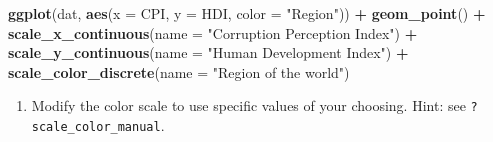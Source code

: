 \documentclass[]{book}
\newenvironment{Shaded}{\begin{snugshade}}{\end{snugshade}}
\newcommand{\KeywordTok}[1]{\textcolor[rgb]{0.13,0.29,0.53}{\textbf{#1}}}
\newcommand{\DataTypeTok}[1]{\textcolor[rgb]{0.13,0.29,0.53}{#1}}
\newcommand{\StringTok}[1]{\textcolor[rgb]{0.31,0.60,0.02}{#1}}
\newcommand{\OperatorTok}[1]{\textcolor[rgb]{0.81,0.36,0.00}{\textbf{#1}}}
\newcommand{\NormalTok}[1]{#1}
\providecommand{\tightlist}{%
  \setlength{\itemsep}{0pt}\setlength{\parskip}{0pt}}
\begin{document}
\begin{Shaded}
\begin{Highlighting}[]
\KeywordTok{ggplot}\NormalTok{(dat, }\KeywordTok{aes}\NormalTok{(}\DataTypeTok{x =}\NormalTok{ CPI, }\DataTypeTok{y =}\NormalTok{ HDI, }\DataTypeTok{color =} \StringTok{"Region"}\NormalTok{)) }\OperatorTok{+}
\KeywordTok{geom_point}\NormalTok{() }\OperatorTok{+}
\KeywordTok{scale_x_continuous}\NormalTok{(}\DataTypeTok{name =} \StringTok{"Corruption Perception Index"}\NormalTok{) }\OperatorTok{+}
\KeywordTok{scale_y_continuous}\NormalTok{(}\DataTypeTok{name =} \StringTok{"Human Development Index"}\NormalTok{) }\OperatorTok{+}
\KeywordTok{scale_color_discrete}\NormalTok{(}\DataTypeTok{name =} \StringTok{"Region of the world"}\NormalTok{)}
\end{Highlighting}
\end{Shaded}

\begin{enumerate}
\def\labelenumi{\arabic{enumi}.}
\setcounter{enumi}{2}
\tightlist
\item
  Modify the color scale to use specific values of your choosing. Hint:
  see \texttt{?scale\_color\_manual}.
\end{enumerate}

\begin{Shaded}
\end{Shaded}
\end{document}
